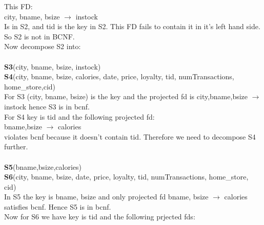 \documentclass{article}
\begin{document}
\begin{enumerate}
	  This FD:\\
	  city, bname, bsize $\rightarrow$ instock\\
		  Is in S2, and tid is the key in S2. This FD fails to contain it in it's left hand side. So S2 is not in BCNF.\\
		  Now decompose S2 into: \\\\
	  \textbf{S3}(city, bname, bsize, instock)\\
	  \textbf{S4}(city, bname, bsize, calories, date, price, loyalty, tid, numTransactions, home\_store,cid)\\
	  For S3 (city, bname, bsize) is the key and the projected fd is city,bname,bsize $\rightarrow$ instock
	  hence S3 is in bcnf.\\
	  For S4 key is tid and the following projected fd:\\
		bname,bsize $\rightarrow$ calories\\
		violates bcnf because it doesn't contain tid. Therefore we need to decompose S4 further.\\\\
	  \textbf{S5}(bname,bsize,calories)\\
	  \textbf{S6}(city, bname, bsize, date, price, loyalty, tid, numTransactions, home\_store, cid)\\
	  In S5 the key is bname, bsize and only projected fd bname, bsize $\rightarrow$ calories satisfies bcnf. Hence
	  S5 is in bcnf.\\
	  Now for S6 we have key is tid and the following prjected fds:
		

\end{enumerate}
\end{document}
